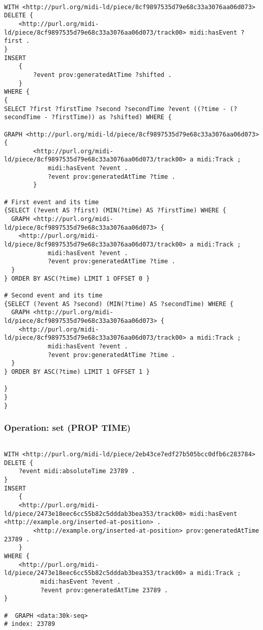 \begin{lstlisting}[language=sparql]

WITH <http://purl.org/midi-ld/piece/8cf9897535d79e68c33a3076aa06d073>
DELETE {
	<http://purl.org/midi-ld/piece/8cf9897535d79e68c33a3076aa06d073/track00> midi:hasEvent ?first .
}
INSERT
	{
		?event prov:generatedAtTime ?shifted .
	}
WHERE {
{
SELECT ?first ?firstTime ?second ?secondTime ?event ((?time - (?secondTime - ?firstTime)) as ?shifted) WHERE {

GRAPH <http://purl.org/midi-ld/piece/8cf9897535d79e68c33a3076aa06d073> {
		<http://purl.org/midi-ld/piece/8cf9897535d79e68c33a3076aa06d073/track00> a midi:Track ;
			midi:hasEvent ?event .
			?event prov:generatedAtTime ?time .
		}

# First event and its time
{SELECT (?event AS ?first) (MIN(?time) AS ?firstTime) WHERE {
  GRAPH <http://purl.org/midi-ld/piece/8cf9897535d79e68c33a3076aa06d073> {
    <http://purl.org/midi-ld/piece/8cf9897535d79e68c33a3076aa06d073/track00> a midi:Track ;
			midi:hasEvent ?event .
			?event prov:generatedAtTime ?time .
  }
} ORDER BY ASC(?time) LIMIT 1 OFFSET 0 }

# Second event and its time
{SELECT (?event AS ?second) (MIN(?time) AS ?secondTime) WHERE {
  GRAPH <http://purl.org/midi-ld/piece/8cf9897535d79e68c33a3076aa06d073> {
    <http://purl.org/midi-ld/piece/8cf9897535d79e68c33a3076aa06d073/track00> a midi:Track ;
			midi:hasEvent ?event .
			?event prov:generatedAtTime ?time .
  }
} ORDER BY ASC(?time) LIMIT 1 OFFSET 1 }

}
}
}

\end{lstlisting}

\subsubsection{Operation: set (PROP TIME)}
\label{query:PROP\-TIME:set}

\begin{lstlisting}[language=sparql]

WITH <http://purl.org/midi-ld/piece/2eb43ce7edf27b505bcc0dfb6c283784>
DELETE {
	?event midi:absoluteTime 23789 .
}
INSERT
	{
    <http://purl.org/midi-ld/piece/2473e18eec6cc55b82c5dddab3bea353/track00> midi:hasEvent <http://example.org/inserted-at-position> .
		<http://example.org/inserted-at-position> prov:generatedAtTime 23789 .
	}
WHERE {
    <http://purl.org/midi-ld/piece/2473e18eec6cc55b82c5dddab3bea353/track00> a midi:Track ;
          midi:hasEvent ?event .
		  ?event prov:generatedAtTime 23789 .
}

#  GRAPH <data:30k-seq>
# index: 23789

\end{lstlisting}


